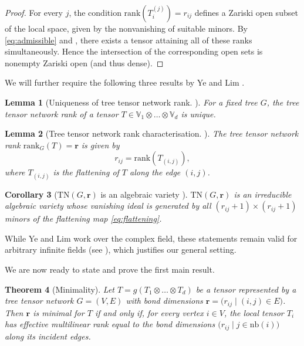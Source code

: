 \documentclass{amsart}
\theoremstyle{plain}
\newtheorem{theorem}{Theorem}[section]
\newtheorem{lemma}[theorem]{Lemma}
\newtheorem{corollary}[theorem]{Corollary}
\theoremstyle{definition}
\theoremstyle{remark}
\begin{document}
\begin{proof}
    For every $j$, the condition $\mathrm{rank}(T_i^{(j)}) = r_{ij}$ defines a Zariski open subset of the local space, given by the nonvanishing of suitable minors.  By \eqref{eq:admissible} and \cite[Theorem 7]{carlinikleppe}, there exists a tensor attaining all of these ranks simultaneously. Hence the intersection of the corresponding open sets is nonempty Zariski open (and thus dense).
\end{proof}

We will further require the following three results by Ye and Lim \cite{limandye}.

\begin{lemma}[Uniqueness of tree tensor network rank. {\cite[Theorem 8.3]{limandye}}] \label{lem:uniqueTTNrank}
    For a fixed tree $G$, the tree tensor network rank of a tensor $T\in\mathbb V_1\otimes\dots\otimes\mathbb V_d$ is unique.
\end{lemma}

\begin{lemma}[Tree tensor network rank characterisation. {\cite[Theorem 8.8]{limandye}}]\label{lem:TTNrank}
    The tree tensor network rank $\mathrm{rank}_G(T)=\mathbf r$ is given by
    \[
        r_{ij}=\mathrm{rank}(T_{(i,j)}),
    \]
    where $T_{(i,j)}$ is the flattening of $T$ along the edge $(i, j)$.
\end{lemma}

\begin{corollary}[$\mathrm{TN}(G, \mathbf{r})$ is an algebraic variety {\cite[Corollary 8.9]{limandye}}] \label{cor:TNvariety}
    $\mathrm{TN}(G, \mathbf{r})$ is an irreducible algebraic variety whose vanishing ideal is generated by all $(r_{ij}+1)\times(r_{ij}+1)$ minors of the flattening map \eqref{eq:flattening}.
\end{corollary}

While Ye and Lim work over the complex field, these statements remain valid for arbitrary infinite fields (see \cite{adams2024}), which justifies our general setting.

We are now ready to state and prove the first main result.

\begin{theorem}[Minimality]\label{theorem:minimality}
Let $T=g(T_1\otimes\dots\otimes T_d)$ be a tensor represented by a tree tensor network $G = (V, E)$ with bond dimensions $\mathbf{r} = \bigl(r_{ij} \mid (i, j)\in E\bigl)$. Then $\mathbf{r}$ is minimal for $T$ if and only if, for every vertex $i \in V$, the local tensor $T_i$ has effective multilinear rank equal to the bond dimensions $\bigl(r_{ij} \mid j\in \mathrm{nb}(i)\bigl)$ along its incident edges.
\end{theorem}
\end{document}
